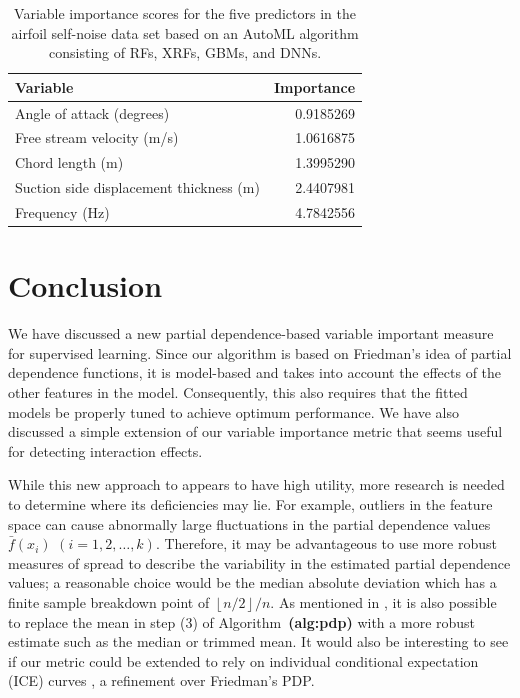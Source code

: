 \documentclass[12pt]{article}
\def\ref#1{\textbf{(#1)}}
\begin{document}
\begin{table}[!htb]
  \centering
  \begin{tabular}{lr}
    \toprule
    Variable                                & Importance\\
    \midrule
    Angle of attack (degrees)               & 0.9185269\\
    Free stream velocity (m/s)              & 1.0616875\\
    Chord length (m)                        & 1.3995290\\
    Suction side displacement thickness (m) & 2.4407981\\
    Frequency (Hz)                          & 4.7842556\\
    \bottomrule
  \end{tabular}
  \caption{Variable importance scores for the five predictors in the airfoil self-noise data set based on an AutoML algorithm consisting of RFs, XRFs, GBMs, and DNNs. \label{tab:aml-vi}}
\end{table}


\section{Conclusion}
\label{sec:conc}

We have discussed a new partial dependence-based variable important measure for supervised learning. Since our algorithm is based on Friedman's idea of partial dependence functions, it is model-based and takes into account the effects of the other features in the model. Consequently, this also requires that the fitted models be properly tuned to achieve optimum performance. We have also discussed a simple extension of our variable importance metric that seems useful for detecting interaction effects.

While this new approach to appears to have high utility, more research is needed to determine where its deficiencies may lie. For example, outliers in the feature space can cause abnormally large fluctuations in the partial dependence values $\bar{f}\left(x_{i}\right)$ $\left(i = 1, 2, \dots, k\right)$. Therefore, it may be advantageous to use more robust measures of spread to describe the variability in the estimated partial dependence values; a reasonable choice would be the median absolute deviation which has a finite sample breakdown point of $\left\lfloor{n / 2}\right\rfloor / n$. As mentioned in \citet{pdp-greenwell-2017}, it is also possible to replace the mean in step (3) of Algorithm~\ref{alg:pdp} with a more robust estimate such as the median or trimmed mean. It would also be interesting to see if our metric could be extended to rely on individual conditional expectation (ICE) curves \citep{goldstein-peeking-2015}, a refinement over Friedman's PDP.
\end{document}
